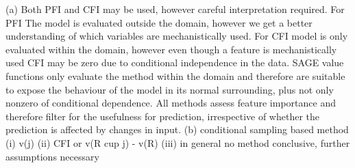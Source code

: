 (a) Both PFI and CFI may be used, however careful interpretation required. For PFI The model is evaluated outside the domain, however we get a better understanding of which variables are mechanistically used. For CFI model is only evaluated within the domain, however even though a feature is mechanistically used CFI may be zero due to conditional independence in the data. SAGE value functions only evaluate the method within the domain and therefore are suitable to expose the behaviour of the model in its normal surrounding, plus not only nonzero of conditional dependence. All methods assess feature importance and therefore filter for the usefulness for prediction, irrespective of whether the prediction is affected by changes in input.
(b) conditional sampling based method
(i) v(j)
(ii) CFI or v(R cup j) - v(R)
(iii) in general no method conclusive, further assumptions necessary